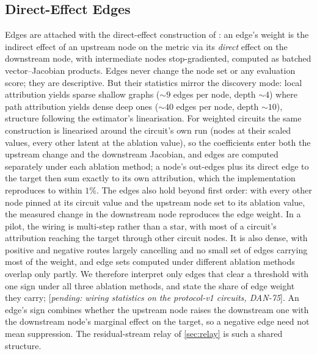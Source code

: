\documentclass[10pt]{article}
\newcommand{\pending}[1]{\textcolor{red!70!black}{[\textit{pending: #1}]}}
\begin{document}
\subsection{Direct-Effect Edges}
\label{app:wcm-edges}
Edges are attached with the direct-effect construction of \citet{marks2025sparse}: an edge's weight is the indirect effect of an upstream node on the metric via its \emph{direct} effect on the downstream node, with intermediate nodes stop-gradiented, computed as batched vector--Jacobian products.
Edges never change the node set or any evaluation score; they are descriptive.
But their statistics mirror the discovery mode: local attribution yields sparse shallow graphs (${\sim}9$ edges per node, depth ${\sim}4$) where path attribution yields dense deep ones (${\sim}40$ edges per node, depth ${\sim}10$), structure following the estimator's linearisation.
For weighted circuits the same construction is linearised around the circuit's own run (nodes at their scaled values, every other latent at the ablation value), so the coefficients enter both the upstream change and the downstream Jacobian, and edges are computed separately under each ablation method; a node's out-edges plus its direct edge to the target then sum exactly to its own attribution, which the implementation reproduces to within $1\%$.
The edges also hold beyond first order: with every other node pinned at its circuit value and the upstream node set to its ablation value, the measured change in the downstream node reproduces the edge weight.
In a pilot, the wiring is multi-step rather than a star, with most of a circuit's attribution reaching the target through other circuit nodes.
It is also dense, with positive and negative routes largely cancelling and no small set of edges carrying most of the weight, and edge sets computed under different ablation methods overlap only partly.
We therefore interpret only edges that clear a threshold with one sign under all three ablation methods, and state the share of edge weight they carry; \pending{wiring statistics on the protocol-v1 circuits, DAN-75}.
An edge's sign combines whether the upstream node raises the downstream one with the downstream node's marginal effect on the target, so a negative edge need not mean suppression.
The residual-stream relay of \cref{sec:relay} is such a shared structure.
\end{document}
